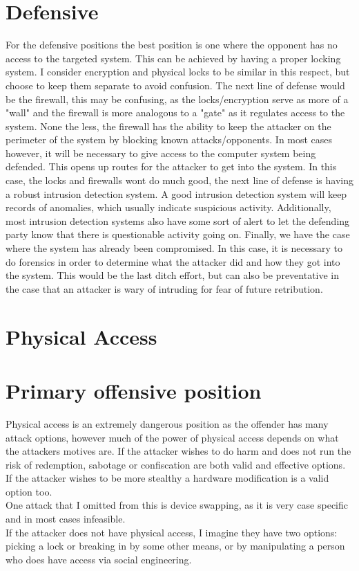 \documentclass{article}
\begin{document}
\section{Defensive}
For the defensive positions the best position is one where the opponent has no access to the targeted system. This can be achieved by having a proper locking system. I consider encryption and physical locks to be similar in this respect, but choose to keep them separate to avoid confusion. The next line of defense would be the firewall, this may be confusing, as the locks/encryption serve as more of a "wall" and the firewall is more analogous to a "gate" as it regulates access to the system. None the less, the firewall has the ability to keep the attacker on the perimeter of the system by blocking known attacks/opponents. In most cases however, it will be necessary to give access to the computer system being defended. This opens up routes for the attacker to get into the system. In this case, the locks and firewalls wont do much good, the next line of defense is having a robust intrusion detection system. A good intrusion detection system will keep records of anomalies, which usually indicate suspicious activity. Additionally, most intrusion detection systems also have some sort of alert to let the defending party know that there is questionable activity going on. Finally, we have the case where the system has already been compromised. In this case, it is necessary to do forensics in order to determine what the attacker did and how they got into the system. This would be the last ditch effort, but can also be preventative in the case that an attacker is wary of intruding for fear of future retribution. \\
\pagebreak

\section{Physical Access}

\section{Primary offensive position}
Physical access is an extremely dangerous position as the offender has many attack options, however much of the power of physical access depends on what the attackers motives are. If the attacker wishes to do harm and does not run the risk of redemption, sabotage or confiscation are both valid and effective options. If the attacker wishes to be more stealthy a hardware modification is a valid option too. \\ 
One attack that I omitted from this is device swapping, as it is very case specific and in most cases infeasible.\\
If the attacker does not have physical access, I imagine they have two options: picking a lock or breaking in by some other means, or by manipulating a person who does have access via social engineering.\\
\end{document}

